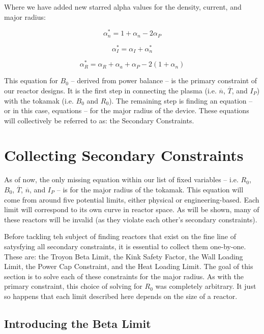 Where we have added new starred alpha values for the density, current, and major radius:

\begin{equation}
  \alpha_n^* = 1+\alpha_n-2\alpha_P
\end{equation}

\begin{equation}
  \alpha_I^* = \alpha_I + \alpha_n^*
\end{equation}

\begin{equation}
  \alpha_R^* = \alpha_R+ \alpha_a +\alpha_P-2 (1+\alpha_n )
\end{equation}

This equation for $B_0$ -- derived from power balance -- is the primary constraint of our reactor designs. It is the first step in connecting the plasma (i.e. $\overline n$, $\overline T$, and $I_P$) with the tokamak (i.e. $B_0$ and $R_0$). The remaining step is finding an equation -- or in this case, equations -- for the major radius of the device. These equations will collectively be referred to as: the Secondary Constraints.

\section{Collecting Secondary Constraints}

As of now, the only missing equation within our list of fixed variables -- i.e. $R_0$, $B_0$, $\overline T$, $\overline n$, and $I_P$ -- is for the major radius of the tokamak. This equation will come from around five potential limits, either physical or engineering-based. Each limit will correspond to its own curve in reactor space. As will be shown, many of these reactors will be invalid (as they violate each other's secondary constraints).

Before tackling teh subject of finding reactors that exist on the fine line of satysfying all secondary constraints, it is essential to collect them one-by-one. These are: the Troyon Beta Limit, the Kink Safety Factor, the Wall Loading Limit, the Power Cap Constraint, and the Heat Loading Limit. The goal of this section is to solve each of these constraints for the major radius. As with the primary constraint, this choice of solving for $R_0$ was completely arbitrary. It just so happens that each limit described here depends on the size of a reactor.

\subsection{Introducing the Beta Limit}

